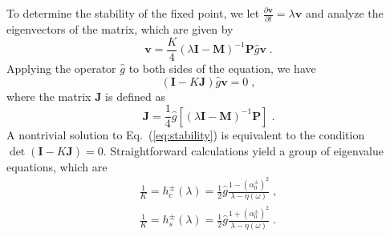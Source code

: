 \documentclass{article}
\begin{document}
To determine the stability of the fixed point, we let $
\frac{\partial \mathbf{v}}{\partial t}=\lambda \mathbf{v}
$ and analyze the eigenvectors of the matrix, which are given by
\begin{equation}
    \mathbf{v}=\frac{K}{4}\left( \lambda \mathbf{I}-\mathbf{M} \right) ^{-1}\mathbf{P}\hat{g}\mathbf{v}\;.
\end{equation}
Applying the operator $\hat{g}$ to both sides of the equation, we have
\begin{equation}
    \label{eq:stability}
    \left( \mathbf{I}-K\mathbf{J} \right) \hat{g}\mathbf{v}=0\;,
\end{equation}
where the matrix $\mathbf{J}$ is defined as
\begin{equation}
    \mathbf{J}=\frac{1}{4}\hat{g}\left[ \left( \lambda \mathbf{I}-\mathbf{M} \right) ^{-1}\mathbf{P} \right]\;.
\end{equation}
A nontrivial solution to Eq.~(\ref{eq:stability}) is equivalent to the condition $\det \left( \mathbf{I}-K\mathbf{J} \right) =0$. Straightforward calculations yield a group of eigenvalue equations, which are
\begin{subequations}
    \label{eq:eigenvalue}
    \begin{align}
        \frac{1}{K}=h_{c}^{\pm}\left( \lambda \right) =\frac{1}{2}\hat{g}\frac{1-\left( \alpha _{0}^{\pm} \right) ^2}{\lambda -\eta \left( \omega \right)}\;,\\
        \frac{1}{K}=h_{s}^{\pm}\left( \lambda \right) =\frac{1}{2}\hat{g}\frac{1+\left( \alpha _{0}^{\pm} \right) ^2}{\lambda -\eta \left( \omega \right)}\;.
    \end{align}
\end{subequations}
\end{document}
